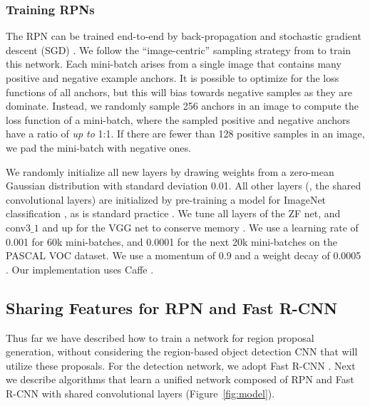 \documentclass[10pt,journal,cspaper,compsoc]{IEEEtran}
\begin{document}
\subsubsection{Training RPNs}
\label{sec:training_rpn}

The RPN can be trained end-to-end by back-propagation and stochastic gradient descent (SGD) \cite{LeCun1989}.
We follow the ``image-centric'' sampling strategy from \cite{Girshick2015a} to train this network. Each mini-batch arises from a single image that contains many positive and negative example anchors. It is possible to optimize for the loss functions of all anchors, but this will bias towards negative samples as they are dominate. Instead, we randomly sample 256 anchors in an image to compute the loss function of a mini-batch, where the sampled positive and negative anchors have a ratio of \emph{up to} 1:1. If there are fewer than 128 positive samples in an image, we pad the mini-batch with negative ones.

We randomly initialize all new layers by drawing weights from a zero-mean Gaussian distribution with standard deviation 0.01. All other layers (\ie, the shared convolutional layers) are initialized by pre-training a model for ImageNet classification \cite{Russakovsky2015}, as is standard practice \cite{Girshick2014}. We tune all layers of the ZF net, and conv3$\_1$ and up for the VGG net to conserve memory \cite{Girshick2015a}.
We use a learning rate of 0.001 for 60k mini-batches, and 0.0001 for the next 20k mini-batches on the PASCAL VOC dataset. We use a momentum of 0.9 and a weight decay of 0.0005 \cite{Krizhevsky2012}. Our implementation uses Caffe \cite{Jia2014}.

\subsection{Sharing Features for RPN and Fast R-CNN}
\label{sec:training}

Thus far we have described how to train a network for region proposal generation, without considering the region-based object detection CNN that will utilize these proposals.
For the detection network, we adopt Fast R-CNN \cite{Girshick2015a}.
Next we describe algorithms that learn a unified network composed of RPN and Fast R-CNN with shared convolutional layers (Figure~\ref{fig:model}).
\end{document}

